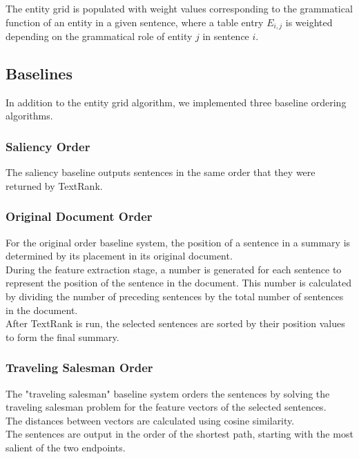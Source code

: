 \documentclass[11pt]{article}
\begin{document}
The entity grid is populated with weight values corresponding to the grammatical function of an entity in a given sentence, where a table entry $E_{i,j}$ is weighted depending on the grammatical role of entity $j$ in sentence $i$. 

\subsection{Baselines}
In addition to the entity grid algorithm, we implemented three baseline ordering algorithms.

\subsubsection{Saliency Order}
The saliency baseline outputs sentences in the same order that they were returned by TextRank.\\

\subsubsection{Original Document Order}
For the original order baseline system, the position of a sentence in a summary is determined by its placement in its original document.\\

During the feature extraction stage, a number is generated for each sentence to represent the position of the sentence in the document. This number is calculated by dividing the number of preceding sentences by the total number of sentences in the document.\\

After TextRank is run, the selected sentences are sorted by their position values to form the final summary.\\

\subsubsection{Traveling Salesman Order}
The "traveling salesman" baseline system orders the sentences by solving the traveling salesman problem for the feature vectors of the selected sentences.\\

The distances between vectors are calculated using cosine similarity.\\

The sentences are output in the order of the shortest path, starting with the most salient of the two endpoints.\\
\end{document}

